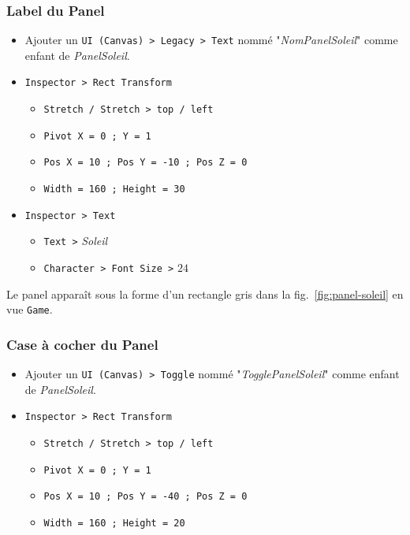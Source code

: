 \documentclass[a4paper,10pt]{article}
\newenvironment{solution}%
{\begin{tcolorbox}[breakable,colback=red!5!white,colframe=red!75!black,title=Solution]}%
{\end{tcolorbox}}
\begin{document}
\begin{solution}
\subsubsection{Label du Panel}
\begin{itemize}
	\item Ajouter un \texttt{UI (Canvas) > Legacy > Text} nommé "\textit{NomPanelSoleil}" comme enfant de \textit{PanelSoleil}.
	\item \texttt{Inspector > Rect Transform}
	\begin{itemize}
		\item \texttt{Stretch / Stretch > top / left}
			\item \texttt{Pivot X = 0 ; Y = 1}
		\item \texttt{Pos X = 10 ; Pos Y = -10 ; Pos Z = 0}
		\item \texttt{Width = 160 ; Height = 30}
	\end{itemize}
	
	\item \texttt{Inspector > Text}
	\begin{itemize}
		\item \texttt{Text >} \textit{Soleil}
		\item \texttt{Character > Font Size >} $24$
	\end{itemize}	
\end{itemize}

Le panel apparaît sous la forme d'un rectangle gris dans la fig.~\ref{fig:panel-soleil} en vue \texttt{Game}.

\subsubsection{Case à cocher du Panel}
\begin{itemize}
	\item Ajouter un \texttt{UI (Canvas) > Toggle} nommé "\textit{TogglePanelSoleil}" comme enfant de \textit{PanelSoleil}.
	\item \texttt{Inspector > Rect Transform}
	\begin{itemize}
		\item \texttt{Stretch / Stretch > top / left}
		\item \texttt{Pivot X = 0 ; Y = 1}
		\item \texttt{Pos X = 10 ; Pos Y = -40 ; Pos Z = 0}
		\item \texttt{Width = 160 ; Height = 20}	
	\end{itemize}
\end{itemize}


\end{solution}
\end{document}
